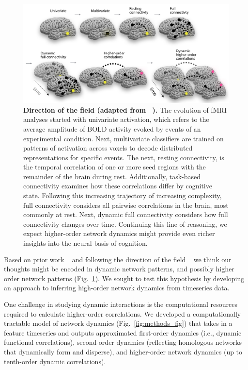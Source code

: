 \documentclass[english]{article}
\begin{document}
\begin{figure}
  \centering
  \includegraphics[width=\textwidth]{figs/direction_of_field.pdf}
  \caption{\textbf{Direction of the field (adapted from
      ~\citep{Turk13}).} The evolution of fMRI analyses started with
    univariate activation, which refers to
    the average amplitude of BOLD activity evoked by events of an
    experimental condition. Next, multivariate classifiers are trained
    on patterns of activation across voxels to decode distributed
    representations for specific events. The next, resting
    connectivity, is the temporal correlation of one or more seed
    regions with the remainder of the brain during rest. Additionally,
    task-based connectivity examines how these correlations differ by
    cognitive state. Following this increasing trajectory of
    increasing complexity, full connectivity considers all pairwise
    correlations in the brain, most commonly at rest.  Next, dynamic
    full connectivity considers how full connectivity changes over
    time. Continuing this line of reasoning, we expect higher-order network dynamics might provide even richer insights into the neural basis of cognition.}
  \label{fig:direction_of_field}
\end{figure}



Based on prior work ~\citep{Deme19} and following the direction of the field ~\citep{Turk13} we think our thoughts might be encoded in
dynamic network patterns, and possibly higher order network
patterns (Fig.~\ref{fig:direction_of_field}). We sought to test this hypothesis by developing an approach
to inferring high-order network dynamics from timeseries data. 

One challenge in studying dynamic interactions is the
computational resources required to calculate higher-order correlations. 
We developed a computationally tractable model of network dynamics (Fig.~\ref{fig:methods_fig}) that takes in a feature
timeseries and outputs approximated first-order dynamics (i.e.,
dynamic functional correlations), second-order dynamics
(reflecting homologous networks that dynamically form and disperse),
and higher-order network dynamics (up to tenth-order dynamic
correlations).
\end{document}
